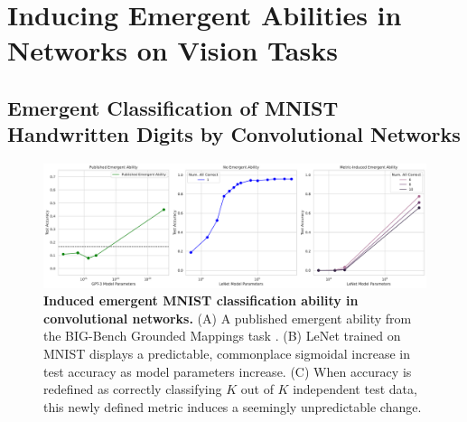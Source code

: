 


\section{Inducing Emergent Abilities in Networks on Vision Tasks}
\label{app:sec:inducing_emergence_vision}

\subsection{Emergent Classification of MNIST Handwritten Digits by Convolutional Networks}

\begin{figure}
    \centering
    \includegraphics[width=\textwidth]{figures/vision/no_emergence_and_emergence_dataset=mnist.pdf}
    \caption{\textbf{Induced emergent MNIST classification ability in convolutional networks.} (A) A published emergent ability from the BIG-Bench Grounded Mappings task \cite{wei2022emergent}. (B) LeNet trained on MNIST \cite{lecun1998mnist} displays a predictable, commonplace sigmoidal increase in test accuracy as model parameters increase. (C) When accuracy is redefined as correctly classifying $K$ out of $K$ independent test data, this newly defined metric induces a seemingly unpredictable change.}
    \label{fig:vision_mnist}
\end{figure}

